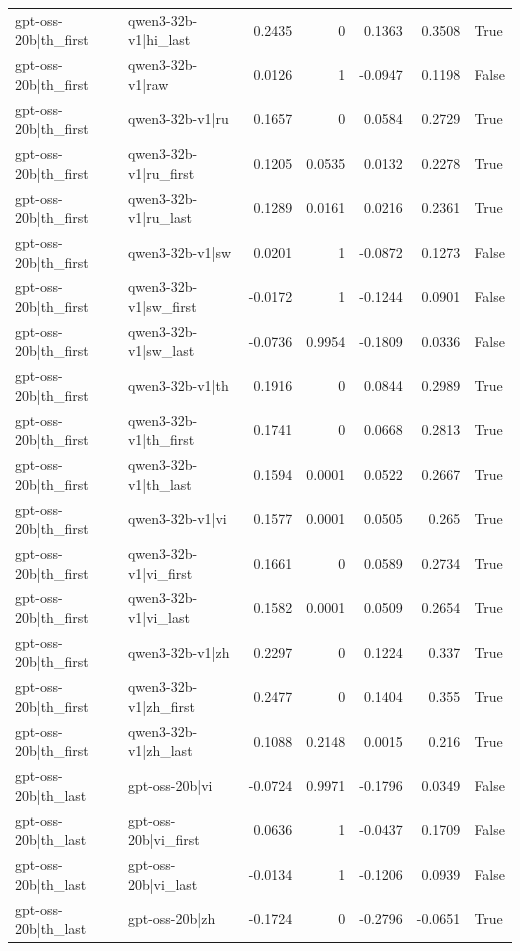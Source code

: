 \begin{table}
\begin{tabular}{l l r r r r l}
gpt-oss-20b|th_first & qwen3-32b-v1|hi_last & 0.2435 & 0 & 0.1363 & 0.3508 & True \\
gpt-oss-20b|th_first & qwen3-32b-v1|raw & 0.0126 & 1 & -0.0947 & 0.1198 & False \\
gpt-oss-20b|th_first & qwen3-32b-v1|ru & 0.1657 & 0 & 0.0584 & 0.2729 & True \\
gpt-oss-20b|th_first & qwen3-32b-v1|ru_first & 0.1205 & 0.0535 & 0.0132 & 0.2278 & True \\
gpt-oss-20b|th_first & qwen3-32b-v1|ru_last & 0.1289 & 0.0161 & 0.0216 & 0.2361 & True \\
gpt-oss-20b|th_first & qwen3-32b-v1|sw & 0.0201 & 1 & -0.0872 & 0.1273 & False \\
gpt-oss-20b|th_first & qwen3-32b-v1|sw_first & -0.0172 & 1 & -0.1244 & 0.0901 & False \\
gpt-oss-20b|th_first & qwen3-32b-v1|sw_last & -0.0736 & 0.9954 & -0.1809 & 0.0336 & False \\
gpt-oss-20b|th_first & qwen3-32b-v1|th & 0.1916 & 0 & 0.0844 & 0.2989 & True \\
gpt-oss-20b|th_first & qwen3-32b-v1|th_first & 0.1741 & 0 & 0.0668 & 0.2813 & True \\
gpt-oss-20b|th_first & qwen3-32b-v1|th_last & 0.1594 & 0.0001 & 0.0522 & 0.2667 & True \\
gpt-oss-20b|th_first & qwen3-32b-v1|vi & 0.1577 & 0.0001 & 0.0505 & 0.265 & True \\
gpt-oss-20b|th_first & qwen3-32b-v1|vi_first & 0.1661 & 0 & 0.0589 & 0.2734 & True \\
gpt-oss-20b|th_first & qwen3-32b-v1|vi_last & 0.1582 & 0.0001 & 0.0509 & 0.2654 & True \\
gpt-oss-20b|th_first & qwen3-32b-v1|zh & 0.2297 & 0 & 0.1224 & 0.337 & True \\
gpt-oss-20b|th_first & qwen3-32b-v1|zh_first & 0.2477 & 0 & 0.1404 & 0.355 & True \\
gpt-oss-20b|th_first & qwen3-32b-v1|zh_last & 0.1088 & 0.2148 & 0.0015 & 0.216 & True \\
gpt-oss-20b|th_last & gpt-oss-20b|vi & -0.0724 & 0.9971 & -0.1796 & 0.0349 & False \\
gpt-oss-20b|th_last & gpt-oss-20b|vi_first & 0.0636 & 1 & -0.0437 & 0.1709 & False \\
gpt-oss-20b|th_last & gpt-oss-20b|vi_last & -0.0134 & 1 & -0.1206 & 0.0939 & False \\
gpt-oss-20b|th_last & gpt-oss-20b|zh & -0.1724 & 0 & -0.2796 & -0.0651 & True \\

\end{tabular}
\end{table}
